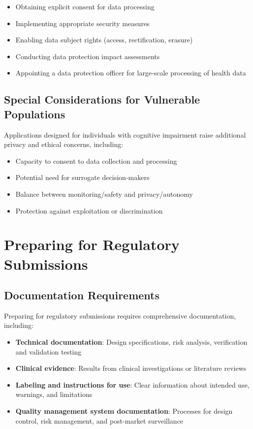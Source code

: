 \begin{itemize}
    \item Obtaining explicit consent for data processing
    \item Implementing appropriate security measures
    \item Enabling data subject rights (access, rectification, erasure)
    \item Conducting data protection impact assessments
    \item Appointing a data protection officer for large-scale processing of health data
\end{itemize}

\subsection{Special Considerations for Vulnerable Populations}
Applications designed for individuals with cognitive impairment raise additional privacy and ethical concerns, including:

\begin{itemize}
    \item Capacity to consent to data collection and processing
    \item Potential need for surrogate decision-makers
    \item Balance between monitoring/safety and privacy/autonomy
    \item Protection against exploitation or discrimination
\end{itemize}

\section{Preparing for Regulatory Submissions}
\subsection{Documentation Requirements}
Preparing for regulatory submissions requires comprehensive documentation, including:

\begin{itemize}
    \item \textbf{Technical documentation}: Design specifications, risk analysis, verification and validation testing
    \item \textbf{Clinical evidence}: Results from clinical investigations or literature reviews
    \item \textbf{Labeling and instructions for use}: Clear information about intended use, warnings, and limitations
    \item \textbf{Quality management system documentation}: Processes for design control, risk management, and post-market surveillance
\end{itemize}

